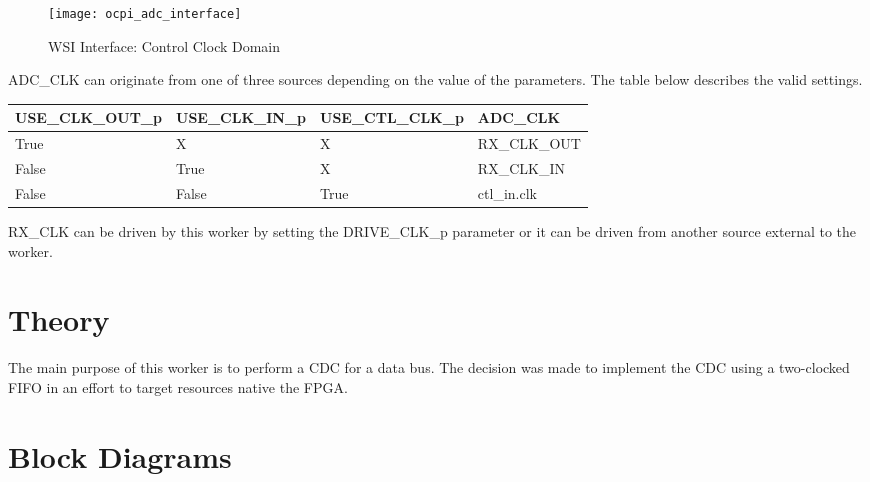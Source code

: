 \begin{figure}[ht]
	\centering
	\texttt{[image: ocpi\_adc\_interface]}
	\caption{WSI Interface: Control Clock Domain}
	\label{fig:ocpi_adc_interface}
\end{figure}
\noindent ADC\_CLK can originate from one of three sources depending on the value of the parameters. The table below describes the valid settings.\par\bigskip
\noindent
\begin{scriptsize}
	\begin{tabular}{|M{4cm}|M{4cm}|M{4cm}|M{4cm}|}
		\hline
		USE\_CLK\_OUT\_p & USE\_CLK\_IN\_p & USE\_CTL\_CLK\_p & ADC\_CLK     \\
		\hline
		True             & X               & X                & RX\_CLK\_OUT \\
		\hline
		False            & True            & X                & RX\_CLK\_IN  \\
		\hline
		False            & False           & True             & ctl\_in.clk  \\
		\hline
	\end{tabular}
\end{scriptsize}\par\bigskip
\noindent RX\_CLK can be driven by this worker by setting the DRIVE\_CLK\_p parameter or it can be driven from another source external to the worker.

\section*{Theory}
The main purpose of this worker is to perform a CDC for a data bus. The decision was made to implement the CDC using a two-clocked FIFO in an effort to target resources native the FPGA.

\section*{Block Diagrams}
